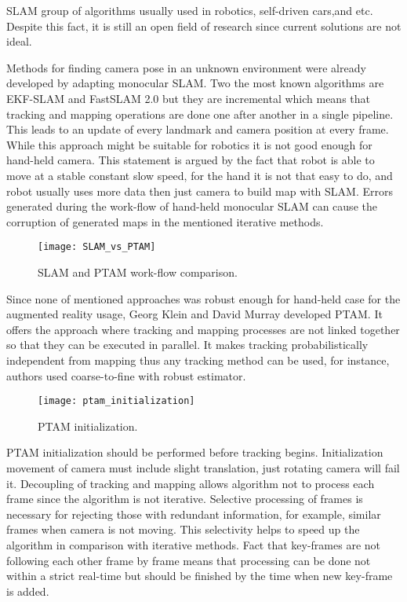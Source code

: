\documentclass[../../../../main]{subfiles}
\begin{document}
\ac{SLAM} group of algorithms usually used in robotics, self-driven cars,and etc. Despite this fact, it is still an open field of research since current solutions are not ideal.

Methods for finding camera pose in an unknown environment were already developed by adapting monocular \ac{SLAM}. Two the most known algorithms are EKF-SLAM and FastSLAM 2.0 but they are incremental which means that tracking and mapping operations are done one after another in a single pipeline. This leads to an update of every landmark and camera position at every frame. While this approach might be suitable for robotics it is not good enough for hand-held camera. This statement is argued by the fact that robot is able to move at a stable constant slow speed, for the hand it is not that easy to do, and robot usually uses more data then just camera to build map with \ac{SLAM}. Errors generated during the work-flow of hand-held monocular \ac{SLAM} can cause the corruption of generated maps in the mentioned iterative methods.

\begin{figure} [ht!]
    \begin{center}
        \texttt{[image: SLAM\_vs\_PTAM]}
        \caption{\ac{SLAM} and \ac{PTAM} work-flow comparison.}
        \label{fig:slam}
    \end{center}
\end{figure}

Since none of mentioned approaches was robust enough for hand-held case for the augmented reality usage, Georg Klein and David Murray developed \ac{PTAM}. It offers the approach where tracking and mapping processes are not linked together so that they can be executed in parallel. It makes tracking probabilistically independent from mapping thus any tracking method can be used, for instance, authors used coarse-to-fine with robust estimator.

\begin{figure} [ht!]
    \begin{center}
        \texttt{[image: ptam\_initialization]}
        \caption{\ac{PTAM} initialization.}
        \label{fig:slam}
    \end{center}
\end{figure}

\ac{PTAM} initialization should be performed before tracking begins. Initialization movement of camera must include slight translation, just rotating camera will fail it. 
Decoupling of tracking and mapping allows algorithm not to process each frame since the algorithm is not iterative. Selective processing of frames is necessary for rejecting those with redundant information, for example, similar frames when camera is not moving. This selectivity helps to speed up the algorithm in comparison with iterative methods. Fact that key-frames are not following each other frame by frame means that processing can be done not within a strict real-time but should be finished by the time when new key-frame is added.
\end{document}
